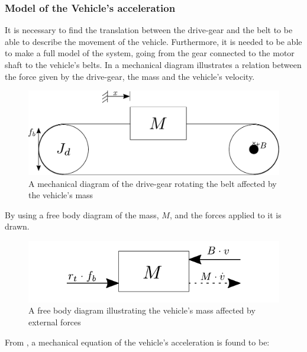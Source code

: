 \subsubsection{Model of the Vehicle's acceleration}\label{BeltModel}
It is necessary to find the translation between the drive-gear and the belt to be able to describe the movement of the vehicle. Furthermore, it is needed to be able to make a full model of the system, going from the gear connected to the motor shaft to the vehicle's belts. In  a mechanical diagram illustrates a relation between the force given by the drive-gear, the mass and the vehicle's velocity.

\begin{figure}[H]
	\centering
	\includegraphics[scale=0.8]{figures/mechanicalDrawingBelt.pdf}
	\caption{A mechanical diagram of the drive-gear rotating the belt affected by the vehicle's mass}
	\label{fig:BeltMechanicalDiagram}
\end{figure}

By using  a free body diagram of the mass, $M$, and the forces applied to it is drawn.

\begin{figure}[H]
	\centering
	\includegraphics[scale=0.8]{figures/freeBodyBelt.pdf}
	\caption{A free body diagram illustrating the vehicle's mass affected by external forces}
	\label{fig:BeltFreeBodyDiagram}
\end{figure}

From , a mechanical equation of the vehicle's acceleration is found to be:

